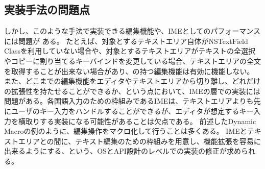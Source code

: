 \subsection{実装手法の問題点}

しかし、このような手法で実装できる編集機能や、IMEとしてのパフォーマンスには問題が
ある。
たとえば、対象とするテキストエリア自体がNSTextField Classを利用していない場合や、対象とするテキストエリアがテキストの全選択やコピーに割り当てるキーバインドを変更している場合、テキストエリアの全文を取得することが出来ない場合があり、{\system}の持つ編集機能は有効に機能しない。
%
また、どこまでの編集機能をエディタやテキストエリアから切り離し、どれだけの拡張性を持たせることができるか、という点において、IMEの層での実装には問題がある。各国語入力のための枠組みであるIMEは、テキストエリアよりも先にユーザのキー入力をハンドルすることができるが、エディタが想定するキー入力を横取りする実装になる可能性があることは欠点である。
%
前述したDynamic Macroの例のように、編集操作をマクロ化して行うことは多くある。
IMEとテキストエリアとの間に、テキスト編集のための枠組みを用意し、機能拡張を容易に出来るようにする、という、OSとAPI設計のレベルでの実装の修正が求められる。

